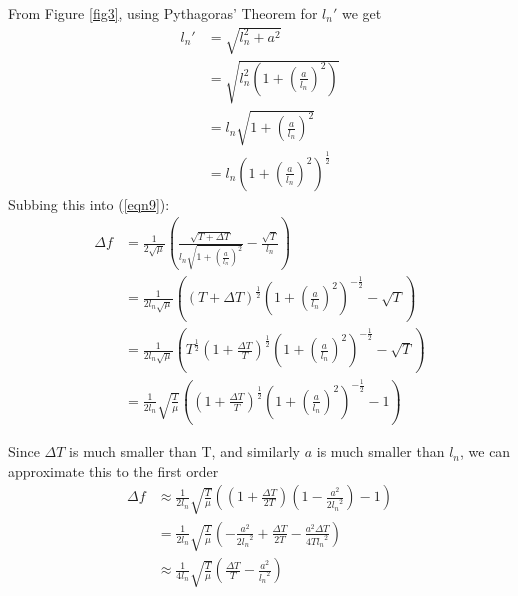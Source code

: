 \documentclass[11pt]{article}
\begin{document}
\begin{flushleft}
                From Figure \ref{fig3}, using Pythagoras' Theorem for $l_n'$ we get
                \begin{align}
                    l_n' &= \sqrt{l_n^2+a^2} \\
                    &= \sqrt{l_n^2\left(1+\left(\frac{a}{l_n}\right) ^2\right)} \\
                    &= l_n \sqrt{1+\left(\frac{a}{l_n}\right) ^2} \\
                    &= l_n \left(1+\left(\frac{a}{l_n}\right) ^2\right)^{\frac{1}{2}} 
                \end{align}
                Subbing this into (\ref{eqn9}):
                \begin{align}
                    \Delta f &= \frac{1}{2\sqrt{\mu}} \left( \frac{\sqrt{T+\Delta T}}{l_n\sqrt{1+\left(\frac{a}{l_n}\right) ^2}} - \frac{\sqrt{T}}{l_n} \right) \\
                    &= \frac{1}{2l_n\sqrt{\mu}} \left( (T+\Delta T)^{\frac{1}{2}} \left( 1+\left(\frac{a}{l_n}\right) ^2\right)^{-\frac{1}{2}} - \sqrt{T} \right) \\
                    &= \frac{1}{2l_n\sqrt{\mu}} \left( T^{\frac{1}{2}}\left(1+\frac{\Delta T}{T}\right)^{\frac{1}{2}} \left( 1+\left(\frac{a}{l_n}\right) ^2\right)^{-\frac{1}{2}} - \sqrt{T} \right) \\
                    &= \frac{1}{2l_n} \sqrt{\frac{T}{\mu}}\left(\left(1+\frac{\Delta T}{T}\right)^{\frac{1}{2}} \left( 1+\left(\frac{a}{l_n}\right) ^2\right)^{-\frac{1}{2}} - 1 \right)
                \end{align}

                Since $\Delta T$ is much smaller than T, and similarly $a$ is much smaller than $l_n$, we can approximate this to the first order
                \begin{align}
                    \Delta f &\approx \frac{1}{2l_n} \sqrt{\frac{T}{\mu}} \left( \left(1+\frac{\Delta T}{2T}\right) \left( 1- \frac{a^2}{2{l_n}^2} \right) - 1\right) \\
                    &= \frac{1}{2l_n} \sqrt{\frac{T}{\mu}} \left( -\frac{a^2}{2{l_n}^2} + \frac{\Delta T}{2T} - \frac{a^2\Delta T}{4T{l_n}^2}\right) \\
                    &\approx \frac{1}{4l_n} \sqrt{\frac{T}{\mu}} \left( \frac{\Delta T}{T} - \frac{a^2}{{l_n}^2} \right) \label{eqn20}
                \end{align}


\end{flushleft}
\end{document}
